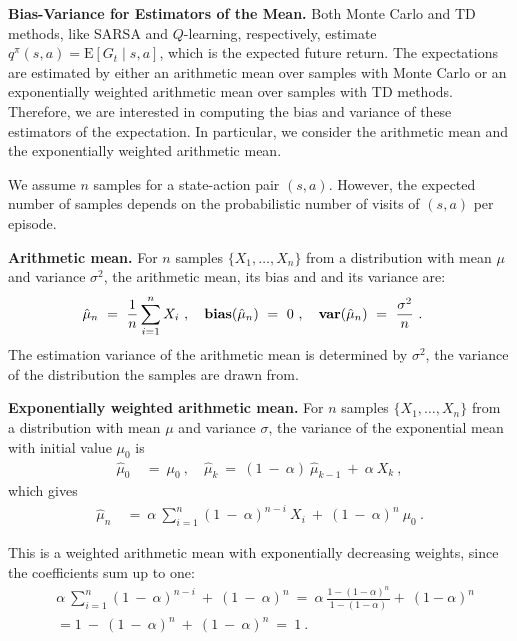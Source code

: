 \documentclass{article}
\newcommand\EXP{\mathbf{\mathrm{E}}}
\newcommand{\bias}{\mathop{\bf bias}}
\newcommand{\var}{\mathop{\bf var}}
\begin{document}
\begin{appendices}
{\bf Bias-Variance for Estimators of the Mean.}
Both Monte Carlo and TD methods, like SARSA and $Q$-learning, respectively, estimate
$q^\pi(s,a)= \EXP\left[ G_t \mid s, a\right]$, which is the expected
future return. The expectations are estimated
by either an arithmetic mean over samples
with Monte Carlo or an exponentially weighted arithmetic mean over samples with TD methods.
Therefore, we are interested in computing the bias and variance of
these estimators of the expectation.
In particular, we consider the arithmetic mean and the
exponentially weighted arithmetic mean.

We assume $n$ samples for a state-action pair $(s,a)$. However, the expected
number of samples depends on the probabilistic number of visits of
$(s,a)$ per episode. 

{\bf Arithmetic mean.}
For $n$ samples $\{X_1,\ldots,X_n\}$ from a distribution with mean
$\mu$ and variance $\sigma^2$, the arithmetic mean, its bias and and its variance are:
\begin{align}
  \hat{\mu}_n \ &= \ \frac{1}{n} \sum_{i=1}^{n} X_i \ , \quad
  \bias(\hat{\mu}_n) \ = \ 0 \ , \quad
  \var (\hat{\mu}_n) \ = \ \frac{\sigma^2}{n} \ .
\end{align}
The estimation variance of the arithmetic mean is determined by $\sigma^2$,
the variance of the distribution the samples are drawn from.

{\bf Exponentially weighted arithmetic mean.}
For $n$ samples $\{X_1,\ldots,X_n\}$ from a distribution with mean
$\mu$ and variance $\sigma$, the variance of the exponential mean with initial value $\mu_0$ is
\begin{align}
  \hat{\mu}_0 \ &= \ \mu_0 \ , \quad
  \hat{\mu}_k \ = \ (1 \ - \ \alpha) \ \hat{\mu}_{k-1} \ + \ \alpha \ X_k \ , 
\end{align}
which gives
\begin{align}
  \hat{\mu}_n \ &= \  \alpha \ \sum_{i=1}^{n}  (1 \  - \ \alpha)^{n-i} \ X_i \ + \ (1 \ - \ \alpha)^{n} \ \mu_0 \ . 
\end{align}

This is a weighted arithmetic mean with 
exponentially decreasing weights, 
since the coefficients sum up to one:
\begin{align}
   &\alpha \ \sum_{i=1}^{n}  (1 \  - \ \alpha)^{n-i} \ + \ (1 \ - \ \alpha)^{n} 
  \ = \ \alpha \ \frac{1-(1-\alpha)^n}{1-(1-\alpha)} +\ (1-\alpha)^n \\ \nonumber
   &= 1 \ - \ (1 \ - \ \alpha)^n \ + \ (1 \ - \ \alpha)^n \ = \ 1 \ .
\end{align}




\end{appendices}
\end{document}
